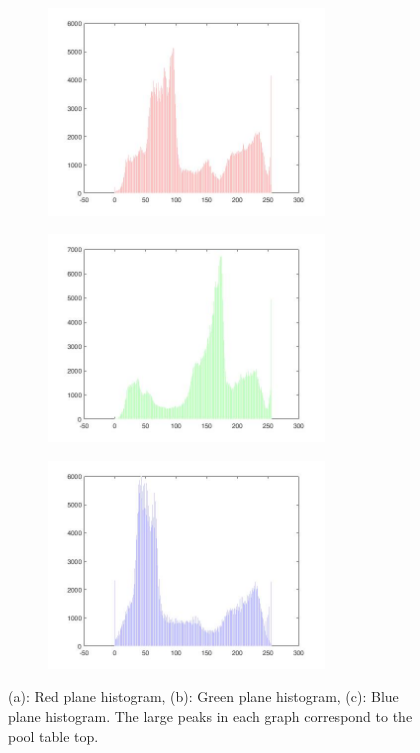 \documentclass[11pt]{article}
\begin{document}
\begin{figure}[H]
\centering
\begin{subfigure}{.49\textwidth}
	\centering
        \includegraphics[width=\linewidth, height = 5.5cm]{redplane.jpg} %
        \caption{}
        \label{red}
\end{subfigure}
\begin{subfigure}{.49\textwidth}
	\centering
        \includegraphics[width=\linewidth,  height = 5.5cm]{greenplane.jpg}
        \caption{}
        \label{green}
\end{subfigure}
\begin{subfigure}{.49\textwidth}
	\centering
        \includegraphics[width=\linewidth, height = 5.5cm]{blueplane.jpg}
        \caption{}
        \label{blue}
\end{subfigure}
\caption{(a): Red plane histogram, (b): Green plane histogram, (c): Blue plane histogram. The large peaks in each graph correspond to the pool table top.}
\label{pool}
\end{figure}
\end{document}
